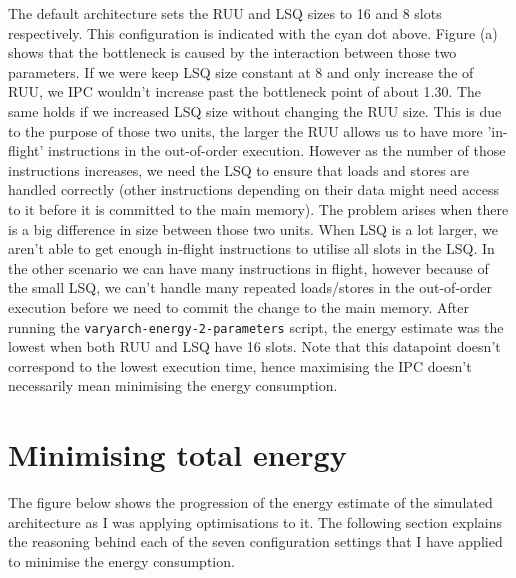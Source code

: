 \documentclass[11pt]{article}
\begin{document}
The default architecture sets the RUU and LSQ sizes to 16 and 8 slots
respectively. This configuration is indicated with the cyan dot above. Figure
(a) shows that the bottleneck is caused by the interaction between those two
parameters. If we were keep LSQ size constant at 8 and only increase the of
RUU, we IPC wouldn't increase past the bottleneck point of about 1.30. The same
holds if we increased LSQ size without changing the RUU size. This is due to
the purpose of those two units, the larger the RUU allows us to have more
'in-flight' instructions in the out-of-order execution. However as the number
of those instructions increases, we need the LSQ to ensure that loads and
stores are handled correctly (other instructions depending on their data might
need access to it before it is committed to the main memory). The problem
arises when there is a big difference in size between those two units. When LSQ
is a lot larger, we aren't able to get enough in-flight instructions to utilise
all slots in the LSQ. In the other scenario we can have many instructions in
flight, however because of the small LSQ, we can't handle many repeated
loads/stores in the out-of-order execution before we need to commit the change
to the main memory. After running the \texttt{varyarch-energy-2-parameters}
script, the energy estimate was the lowest when both RUU and LSQ have 16 slots.
Note that this datapoint doesn't correspond to the lowest execution time, hence
maximising the IPC doesn't necessarily mean minimising the energy consumption.

\section*{Minimising total energy}
\vspace{-0.5em}
The figure below shows the progression of the energy estimate of the simulated
architecture as I was applying optimisations to it. The following section explains
the reasoning behind each of the seven configuration settings that I have applied
to minimise the energy consumption.
\end{document}
